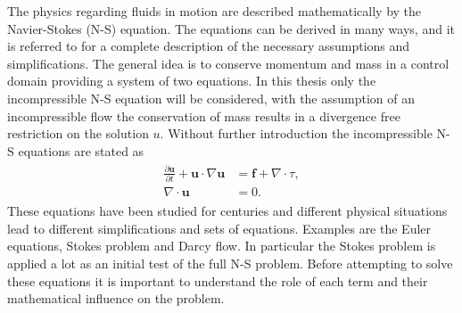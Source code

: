 The physics regarding fluids in motion are described mathematically by the Navier-Stokes (N-S) equation. 
The equations can be derived in many ways, and it is referred to \cite{White} for a complete 
description of the necessary assumptions and simplifications.
The general idea is to conserve momentum and mass in a control domain providing a system of two equations.
In this thesis only the incompressible N-S equation will be considered, 
with the assumption of an incompressible flow the conservation of mass 
results in a divergence free restriction on the solution $u$.
Without further introduction the incompressible  N-S equations are stated as  
%
\begin{align}
    \begin{split}
    \frac{\partial \mathbf{u}}{\partial t} + \mathbf{u}\cdot \nabla\mathbf{u} &= 
    \mathbf{f} + \nabla \cdot \tau, \\
		\nabla \cdot \mathbf{u} &= 0.
    \end{split}
	\label{eq:NS}
\end{align}
%
These equations have been studied for centuries and different physical situations
lead to different simplifications and sets of equations.
Examples are the Euler equations,
Stokes problem and Darcy flow.
In particular the Stokes problem is applied a lot as an initial test of the full N-S problem. 
Before attempting to solve these equations it is important to understand the role of each term 
and their mathematical influence on the problem. 
